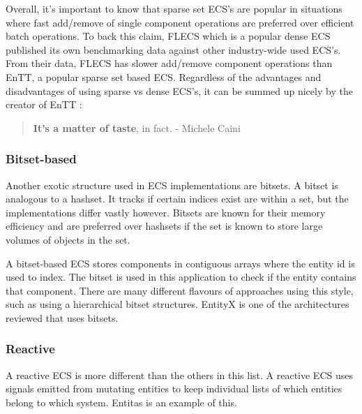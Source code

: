 Overall, it's important to know that sparse set ECS's are popular in situations where fast add/remove of single component operations are preferred over efficient batch operations. To back this claim, FLECS which is a popular dense ECS published its own benchmarking data against other industry-wide used ECS's. From their data, FLECS has slower add/remove component operations than EnTT, a popular sparse set based ECS.\cite{FLECS_EnTTCompare} Regardless of the advantages and disadvantages of using sparse vs dense ECS's, it can be summed up nicely by the creator of EnTT \cite{EnTT_archetype_and_quote}:

\begin{quote}
    \textbf{It’s a matter of taste}, in fact.
        - Michele Caini
\end{quote}

\subsubsection{Bitset-based}
Another exotic structure used in ECS implementations are bitsets. A bitset is analogous to a hashset. It tracks if certain indices exist are within a set, but the implementations differ vastly however. Bitsets are known for their memory efficiency and are preferred over hashsets if the set is known to store large volumes of objects in the set. \cite{Sutherland2014}

A bitset-based ECS stores components in contiguous arrays where the entity id is used to index. The bitset is used in this application to check if the entity contains that component. There are many different flavours of approaches using this style, such as using a hierarchical bitset structures. \cite{SanderMertensFAQ} EntityX is one of the architectures reviewed that uses bitsets.

\subsubsection{Reactive}
A reactive ECS is more different than the others in this list. A reactive ECS uses signals emitted from mutating entities to keep individual lists of which entities belong to which system. Entitas is an example of this. \cite{SanderMertensECS}


